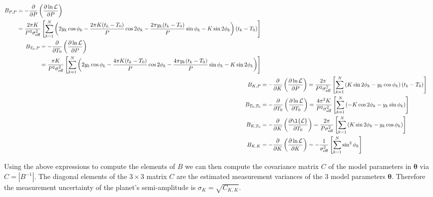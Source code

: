 \begin{align}
  \begin{split}
    B_{P,P} &= -\frac{\partial}{\partial P} \left( \frac{\partial \ln{\mathcal{L}}}{\partial P} \right) \\
    &= \frac{2\pi K}{P^3 \sigma_{\text{eff}}^2} \left[ \sum_{k=1}^{N} \left( 2y_k \cos{\phi_k}
      - \frac{2\pi K (t_k-T_0)}{P}\cos{2\phi_k} -\frac{2\pi y_k (t_k-T_0)}{P} \sin{\phi_k} -K \sin{2\phi_k} \right) (t_k-T_0) \right]
  \end{split} \\
  \begin{split}
    B_{T_0,P} &= -\frac{\partial}{\partial T_0} \left( \frac{\partial \ln{\mathcal{L}}}{\partial P} \right) \\
    &= \frac{\pi K}{P^2 \sigma_{\text{eff}}^2} \left[ \sum_{k=1}^{N} \left( 2y_k \cos{\phi_k}
      -\frac{4\pi K (t_k-T_0)}{P} \cos{2\phi_k} -\frac{4\pi y_k (t_k-T_0)}{P} \sin{\phi_k} - K \sin{2\phi_k}  \right) \right]
  \end{split} \\
  B_{K,P} &= -\frac{\partial}{\partial K} \left( \frac{\partial \ln{\mathcal{L}}}{\partial P} \right)
  = \frac{2\pi}{P^2 \sigma_{\text{eff}}^2} \left[ \sum_{k=1}^{N} \left( K\sin{2\phi_k} -y_k\cos{\phi_k} \right) (t_k-T_0) \right] \\
  B_{T_0,T_0} &= -\frac{\partial}{\partial T_0} \left( \frac{\partial \ln{\mathcal{L}}}{\partial T_0} \right)
  = \frac{4\pi^2 K}{P^2 \sigma_{\text{eff}}^2} \left[ \sum_{k=1}^{N} \left( -K\cos{2\phi_k} - y_k \sin{\phi_k} \right) \right] \\
  B_{K,T_0} &= -\frac{\partial}{\partial K} \left( \frac{\partial \l{\mathcal{L}}}{\partial T_0} \right)
  = \frac{2\pi}{P \sigma_{\text{eff}}^2} \left[ \sum_{k=1}^{N} \left( K \sin{2\phi_k} -y_k\cos{\phi_k}  \right) \right] \\
  B_{K,K} &= -\frac{\partial}{\partial K} \left( \frac{\partial \ln{\mathcal{L}}}{\partial K} \right)
  = -\frac{1}{\sigma_{\text{eff}}^2} \left[ \sum_{k=1}^{N} \sin^2{\phi_k} \right] 
\end{align}

Using the above expressions to compute the elements of $B$ we can then compute the covariance matrix $C$ of the model
parameters in $\boldsymbol{\theta}$ via $C=|B^{-1}|$. The diagonal elements of the $3 \times 3$ matrix $C$ are the
estimated measurement variances of the 3 model parameters $\boldsymbol{\theta}$. Therefore the measurement uncertainty of
the planet's semi-amplitude is $\sigma_{K} = \sqrt{C_{K,K}}$. 


